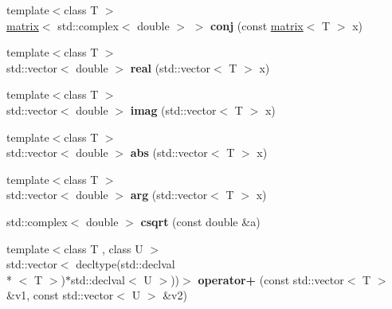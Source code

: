 \begin{DoxyCompactItemize}
\item 
\hypertarget{namespacekeycpp_a5cbc9dd508d193697eb9dfbef01f1404}{{\footnotesize template$<$class T $>$ }\\\hyperlink{classkeycpp_1_1matrix}{matrix}$<$ std\-::complex$<$ double $>$ $>$ {\bfseries conj} (const \hyperlink{classkeycpp_1_1matrix}{matrix}$<$ T $>$ x)}\label{namespacekeycpp_a5cbc9dd508d193697eb9dfbef01f1404}

\item 
\hypertarget{namespacekeycpp_a76cd22caf522d677271fb915fb3aec37}{{\footnotesize template$<$class T $>$ }\\std\-::vector$<$ double $>$ {\bfseries real} (std\-::vector$<$ T $>$ x)}\label{namespacekeycpp_a76cd22caf522d677271fb915fb3aec37}

\item 
\hypertarget{namespacekeycpp_a22cc33e0299a65158c81352603bcd35a}{{\footnotesize template$<$class T $>$ }\\std\-::vector$<$ double $>$ {\bfseries imag} (std\-::vector$<$ T $>$ x)}\label{namespacekeycpp_a22cc33e0299a65158c81352603bcd35a}

\item 
\hypertarget{namespacekeycpp_a01edbbe2645ae65b6ec2c08b2d4352e4}{{\footnotesize template$<$class T $>$ }\\std\-::vector$<$ double $>$ {\bfseries abs} (std\-::vector$<$ T $>$ x)}\label{namespacekeycpp_a01edbbe2645ae65b6ec2c08b2d4352e4}

\item 
\hypertarget{namespacekeycpp_a70d66686c6b209cc8eb64f84977544da}{{\footnotesize template$<$class T $>$ }\\std\-::vector$<$ double $>$ {\bfseries arg} (std\-::vector$<$ T $>$ x)}\label{namespacekeycpp_a70d66686c6b209cc8eb64f84977544da}

\item 
\hypertarget{namespacekeycpp_a952e5296774667c3be4e792b5cd980da}{std\-::complex$<$ double $>$ {\bfseries csqrt} (const double \&a)}\label{namespacekeycpp_a952e5296774667c3be4e792b5cd980da}

\item 
\hypertarget{namespacekeycpp_a4da6882977b2262f8d6f080b0eaf60c5}{{\footnotesize template$<$class T , class U $>$ }\\std\-::vector$<$ decltype(std\-::declval\\*
$<$ T $>$)$\ast$std\-::declval$<$ U $>$))$>$ {\bfseries operator+} (const std\-::vector$<$ T $>$ \&v1, const std\-::vector$<$ U $>$ \&v2)}\label{namespacekeycpp_a4da6882977b2262f8d6f080b0eaf60c5}


\end{DoxyCompactItemize}
